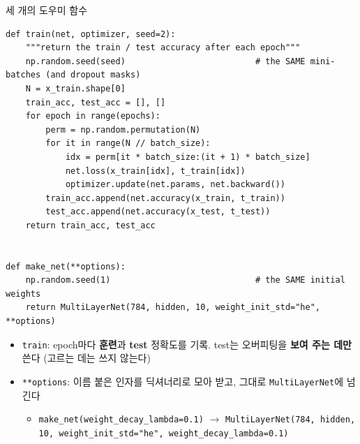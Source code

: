 \documentclass[aspectratio=169,11pt]{beamer}
\newcommand{\codetiny}{\ttfamily\fontsize{6.8}{7.6}\selectfont}
\newcommand{\code}[1]{\texttt{#1}}
\begin{document}
\begin{frame}{세 개의 도우미 함수}
\footnotesize
\begin{lstlisting}[basicstyle=\codetiny]
def train(net, optimizer, seed=2):
    """return the train / test accuracy after each epoch"""
    np.random.seed(seed)                          # the SAME mini-batches (and dropout masks)
    N = x_train.shape[0]
    train_acc, test_acc = [], []
    for epoch in range(epochs):
        perm = np.random.permutation(N)
        for it in range(N // batch_size):
            idx = perm[it * batch_size:(it + 1) * batch_size]
            net.loss(x_train[idx], t_train[idx])
            optimizer.update(net.params, net.backward())
        train_acc.append(net.accuracy(x_train, t_train))
        test_acc.append(net.accuracy(x_test, t_test))
    return train_acc, test_acc


def make_net(**options):
    np.random.seed(1)                             # the SAME initial weights
    return MultiLayerNet(784, hidden, 10, weight_init_std="he", **options)
\end{lstlisting}
\small
\begin{itemize}
\item \code{train}: epoch마다 \textbf{훈련}과 \textbf{test} 정확도를 기록. test는 오버피팅을 \textbf{보여 주는 데만} 쓴다 (고르는 데는 쓰지 않는다)
\item \code{**options}: 이름 붙은 인자를 딕셔너리로 모아 받고, 그대로 \code{MultiLayerNet}에 넘긴다
\begin{itemize}
\item \code{make\_net(weight\_decay\_lambda=0.1)} $\to$ \code{MultiLayerNet(784, hidden, 10, weight\_init\_std="he", weight\_decay\_lambda=0.1)}
\end{itemize}
\end{itemize}
\end{frame}
\end{document}
